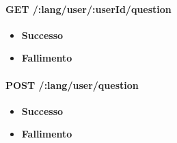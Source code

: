 
\paragraph{GET /:lang/user/:userId/question}
\begin{itemize}
\item \textbf{Successo}
\item \textbf{Fallimento}
\end{itemize}

\paragraph{POST /:lang/user/question}
\begin{itemize}
\item \textbf{Successo}
\item \textbf{Fallimento}
\end{itemize}
